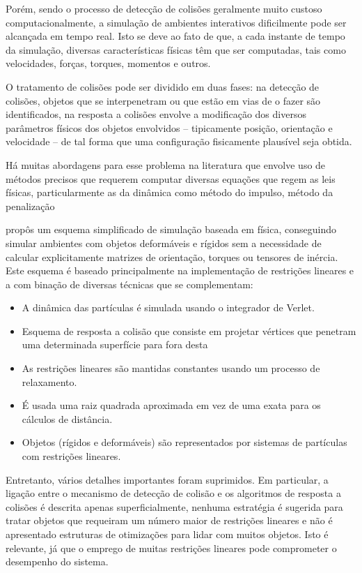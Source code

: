 Porém, sendo o processo de detecção de colisões geralmente muito custoso computacionalmente, a simulação de ambientes interativos dificilmente pode ser alcançada em tempo real. Isto se deve ao fato de que, a cada instante de tempo da simulação, diversas características físicas têm que ser computadas, tais como velocidades, forças, torques, momentos e outros.

O tratamento de colisões pode ser dividido em duas fases: na detecção de colisões, objetos que se interpenetram ou que estão em vias de o fazer são identificados, na resposta a colisões envolve a modificação dos diversos parâmetros físicos dos objetos envolvidos – tipicamente posição, orientação e velocidade – de tal forma que uma configuração fisicamente plausível seja obtida. 

Há muitas abordagens para esse problema na literatura que envolve uso de métodos precisos que requerem computar diversas equações que regem as leis físicas, particularmente as da dinâmica como método do impulso, método da penalização %

 propôs um esquema simplificado de simulação baseada em física, conseguindo simular ambientes com objetos deformáveis e rígidos sem a necessidade de calcular explicitamente matrizes de orientação, torques ou tensores de inércia. Este esquema é baseado principalmente na implementação de restrições lineares e a com binação de diversas técnicas que se complementam:

\begin{itemize}
	\item A dinâmica das partículas é simulada usando o integrador de Verlet.
	\item Esquema de resposta a colisão que consiste em projetar vértices que penetram uma determinada superfície para fora desta
	\item As restrições lineares são mantidas constantes usando um processo de relaxamento.
	\item É usada uma raiz quadrada aproximada em vez de uma exata para os cálculos de distância.
	\item Objetos (rígidos e deformáveis) são representados por sistemas de partículas com restrições lineares.
\end{itemize}

Entretanto, vários detalhes importantes foram suprimidos. Em particular, a ligação entre o mecanismo de detecção de colisão e os algoritmos de resposta a colisões é descrita apenas superficialmente, nenhuma estratégia é sugerida para tratar objetos que requeiram um número maior de restrições lineares e não é apresentado estruturas de otimizações para lidar com muitos objetos. Isto é relevante, já que o emprego de muitas restrições lineares pode comprometer o desempenho do sistema.

